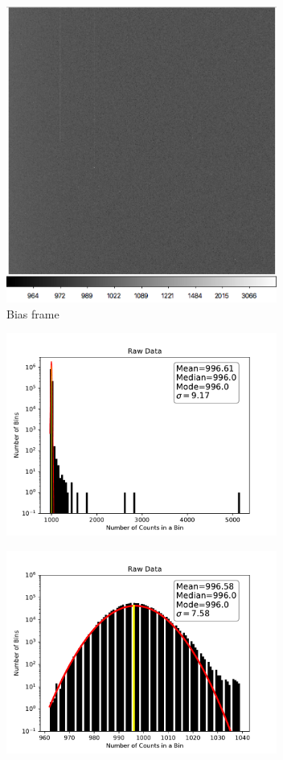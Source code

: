 \documentclass[preprint]{aastex62}
\begin{document}
        \begin{figure}
          \centering
            \includegraphics[width=3.5in]{../images/3p1_m10_00000000_BIAS.png}
            \caption{Bias frame}
          \label{fig:m10BIASfits}
        \end{figure}
        \begin{figure}
          \centering
            \includegraphics[width=3.5in]{../images/neg10BIAS_raw.pdf}
            \caption{}
          \label{fig:neg10BIAShisto}
        \end{figure}
        \begin{figure}
          \centering
            \includegraphics[width=3.5in]{../images/neg10BIAS_clipped.pdf}
            \caption{}
          \label{fig:neg10BIAShisto_clipped}
        \end{figure}
    
\end{document}
